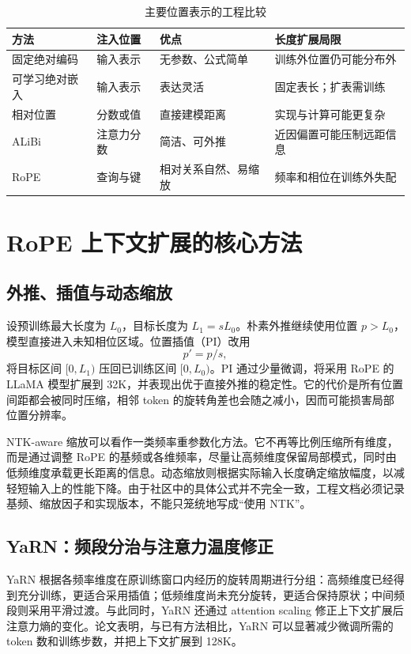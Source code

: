 \documentclass[UTF8,10pt,a4paper,fontset=none]{ctexart}
\begin{document}
\begin{table}[h]
\centering\small
\caption{主要位置表示的工程比较}
\begin{tabularx}{\textwidth}{p{2.2cm}p{2.5cm}X X}
\toprule
方法 & 注入位置 & 优点 & 长度扩展局限\\
\midrule
固定绝对编码 & 输入表示 & 无参数、公式简单 & 训练外位置仍可能分布外\\
可学习绝对嵌入 & 输入表示 & 表达灵活 & 固定表长；扩表需训练\\
相对位置 & 分数或值 & 直接建模距离 & 实现与计算可能更复杂\\
ALiBi & 注意力分数 & 简洁、可外推 & 近因偏置可能压制远距信息\\
RoPE & 查询与键 & 相对关系自然、易缩放 & 频率和相位在训练外失配\\
\bottomrule
\end{tabularx}
\end{table}

\section{RoPE 上下文扩展的核心方法}
\subsection{外推、插值与动态缩放}
设预训练最大长度为 $L_0$，目标长度为 $L_1=sL_0$。朴素外推继续使用位置 $p>L_0$，模型直接进入未知相位区域。位置插值（PI）改用
\begin{equation}
p'=p/s,
\end{equation}
将目标区间 $[0,L_1)$ 压回已训练区间 $[0,L_0)$。PI 通过少量微调，将采用 RoPE 的 LLaMA 模型扩展到 32K，并表现出优于直接外推的稳定性\cite{chen2023pi}。它的代价是所有位置间距都会被同时压缩，相邻 token 的旋转角差也会随之减小，因而可能损害局部位置分辨率。

NTK-aware 缩放可以看作一类频率重参数化方法。它不再等比例压缩所有维度，而是通过调整 RoPE 的基频或各维频率，尽量让高频维度保留局部模式，同时由低频维度承载更长距离的信息。动态缩放则根据实际输入长度确定缩放幅度，以减轻短输入上的性能下降。由于社区中的具体公式并不完全一致，工程文档必须记录基频、缩放因子和实现版本，不能只笼统地写成“使用 NTK”。

\subsection{YaRN：频段分治与注意力温度修正}
YaRN 根据各频率维度在原训练窗口内经历的旋转周期进行分组：高频维度已经得到充分训练，更适合采用插值；低频维度尚未充分旋转，更适合保持原状；中间频段则采用平滑过渡。与此同时，YaRN 还通过 attention scaling 修正上下文扩展后注意力熵的变化。论文表明，与已有方法相比，YaRN 可以显著减少微调所需的 token 数和训练步数，并把上下文扩展到 128K\cite{peng2023yarn}。
\end{document}

